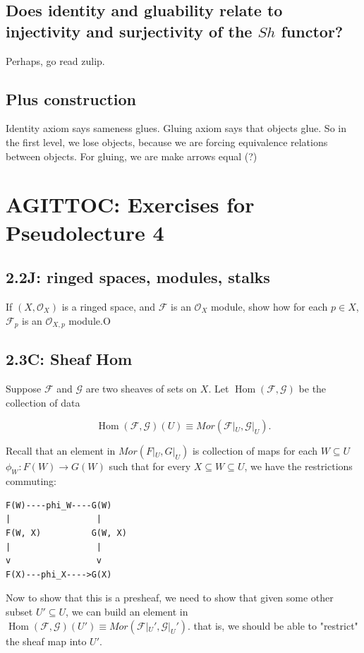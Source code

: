 \documentclass{book}
\newcommand{\Hom}{\operatorname{Hom}}
\newcommand{\F}{\ensuremath{\mathcal{F}}}
\newcommand{\G}{\ensuremath{\mathcal{G}}}
\renewcommand{\O}{\ensuremath{\mathcal{O}}}
\theoremstyle{definition}
\begin{document}
\section{Does identity and gluability relate to injectivity and surjectivity of the $Sh$ functor?}
Perhaps, go read zulip.


\section{Plus construction}
Identity axiom says sameness glues. Gluing axiom says that objects glue. So 
in the first level, we lose objects, because we are forcing equivalence relations
between objects. For gluing, we are make arrows equal (?)

\chapter{AGITTOC: Exercises for Pseudolecture 4}

\section{2.2J: ringed spaces, modules, stalks}
    
If $(X, \O_X)$ is a ringed space, and $\F$ is an $\O_X$ module, show how
for each $p \in X$, $\F_p$ is an $\O_{X, p}$ module.O 


\section{2.3C: Sheaf Hom}
Suppose $\F$ and $\G$ are two sheaves of sets on $X$. Let $\Hom(\F, \G)$
be the collection of data

$$
\Hom(\F, \G)(U) \equiv Mor(\F|_U, \G|_U).
$$

Recall that an element in $Mor(F|_U, G|_U)$ is collection of maps for
each $W \subseteq U$
$\phi_W: F(W) \rightarrow G(W)$ such that for every $X \subseteq W \subseteq U$,
we have the restrictions commuting:

\begin{verbatim}
F(W)----phi_W----G(W)
|                 |
F(W, X)          G(W, X)
|                 |
v                 v
F(X)---phi_X---->G(X)
\end{verbatim}

Now to show that this is a presheaf, we need to show that given some other
subset $U' \subseteq U$, we can build an element in
$\Hom(\F, \G)(U') \equiv Mor(\F|_U', \G|_U')$. that is, we should be able
to "restrict" the sheaf map into $U'$.
\end{document}
